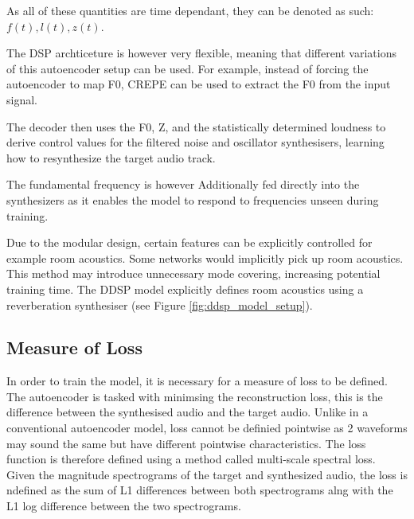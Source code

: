 As all of these quantities are time dependant, they can be denoted as such: $f(t), l(t), z(t)$.

The DSP archticeture is however very flexible, meaning that different variations of this autoencoder setup can be used. For example, instead of forcing the autoencoder to map F0, CREPE can be used to extract the F0 from the input signal.

\vspace{0.5cm}
\vspace{0.5cm}

The decoder then uses the F0, Z, and the statistically determined loudness to derive control values for the filtered noise and oscillator synthesisers, learning how to resynthesize the target audio track.

The fundamental frequency is however Additionally fed directly into the synthesizers as it enables the model to respond to frequencies unseen during training\cite{SingingDDSP}.

Due to the modular design, certain features can be explicitly controlled for example room acoustics. Some networks would implicitly pick up room acoustics. This method may introduce unnecessary mode covering, increasing potential training time. The DDSP model explicitly defines room acoustics using a reverberation synthesiser (see Figure \ref{fig:ddsp_model_setup}).

\subsection{Measure of Loss}

In order to train the model, it is necessary for a measure of loss to be defined. The autoencoder is tasked with minimsing the reconstruction loss, this is the difference between the synthesised audio and the target audio. Unlike in a conventional autoencoder model, loss cannot be definied pointwise as 2 waveforms may sound the same but have different pointwise characteristics. The loss function is therefore defined using a method called multi-scale spectral loss. Given the magnitude spectrograms of the target and synthesized audio, the loss is ndefined as the sum of L1 differences between both spectrograms alng with the L1 log difference between the two spectrograms.

